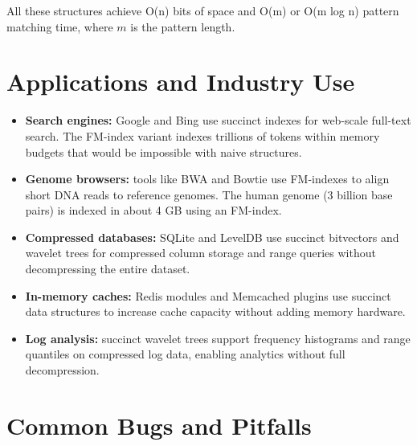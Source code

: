 All these structures achieve O(n) bits of space and O(m) or O(m log n) pattern matching time, where $m$ is the pattern length.

\section{Applications and Industry Use}\label{sec22:applications}

\begin{itemize}
\item \textbf{Search engines:} Google and Bing use succinct indexes for web-scale full-text search. The FM-index variant indexes trillions of tokens within memory budgets that would be impossible with naive structures.

\item \textbf{Genome browsers:} tools like BWA and Bowtie use FM-indexes to align short DNA reads to reference genomes. The human genome (3 billion base pairs) is indexed in about 4 GB using an FM-index.

\item \textbf{Compressed databases:} SQLite and LevelDB use succinct bitvectors and wavelet trees for compressed column storage and range queries without decompressing the entire dataset.

\item \textbf{In-memory caches:} Redis modules and Memcached plugins use succinct data structures to increase cache capacity without adding memory hardware.

\item \textbf{Log analysis:} succinct wavelet trees support frequency histograms and range quantiles on compressed log data, enabling analytics without full decompression.
\end{itemize}

\section{Common Bugs and Pitfalls}\label{sec22:pitfalls}


